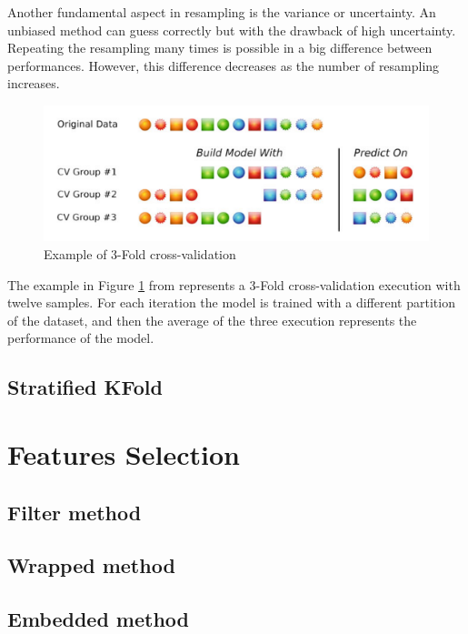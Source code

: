 Another fundamental aspect in resampling is the variance or uncertainty. An unbiased method can guess correctly but with the drawback of high uncertainty. Repeating the resampling many times is possible in a big difference between performances. However, this difference decreases as the number of resampling increases.\\

\begin{figure}[!h]
	\centering
	\includegraphics[width=1.0\columnwidth]{kfold}
	\caption{Example of 3-Fold cross-validation}
	\label{fig:kfold}
\end{figure}

The example in Figure \ref{fig:kfold} from \cite{kuhn2013applied}
represents a 3-Fold cross-validation execution with twelve samples. For each iteration the model is trained with a different partition of the dataset, and then the average of the three execution represents the performance of the model.

\subsection{Stratified KFold}

\section{Features Selection}
\subsection{Filter method}
\subsection{Wrapped method}
\subsection{Embedded method}